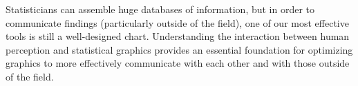 \documentclass[11pt,letterpaper,sans,unicode]{moderncv}        %
\begin{document}
\vspace{.65cm}Statisticians can assemble huge databases of information, but in order to communicate findings (particularly outside of the field), one of our most effective tools is still a well-designed chart. Understanding the interaction between human perception and statistical graphics provides an essential foundation for optimizing graphics to more effectively communicate with each other and with those outside of the field. 
\end{document}
